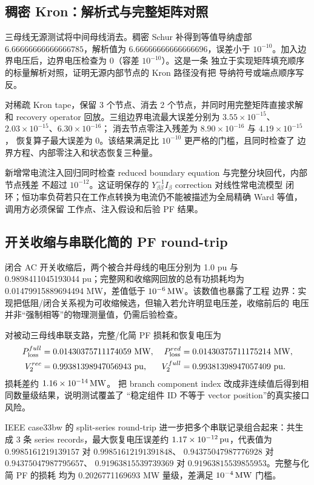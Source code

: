 \subsection{稠密 Kron：解析式与完整矩阵对照}

三母线无源测试将中间母线消去。稠密 Schur 补得到等值导纳虚部
\(6.66666666666666785\)，解析值为 \(6.66666666666666696\)，误差小于
\(10^{-10}\)。加入边界电压后，边界电压检查为 0（容差 \(10^{-10}\)）。这是一条
独立于实现矩阵填充顺序的标量解析对照，证明无源内部节点的 Kron 路径没有把
导纳符号或端点顺序写反。

对稀疏 Kron tape，保留 3 个节点、消去 2 个节点，并同时用完整矩阵直接求解和
recovery operator 回放。三组边界电流最大误差分别为
\(3.55\times10^{-15}\)、\(2.03\times10^{-15}\)、\(6.30\times10^{-16}\)；
消去节点零注入残差为 \(8.90\times10^{-16}\) 与 \(4.19\times10^{-15}\)，
恢复算子最大误差为 0。该结果满足比 \(10^{-10}\) 更严格的门槛，且同时检查了
边界方程、内部零注入和状态恢复三种量。

新增常电流注入回归同时检查 reduced boundary equation 与完整分块回代，内部节点残差
不超过 \(10^{-12}\)。这证明保存的 $Y_{\beta\beta}^{-1}I_\beta$ correction 对线性常电流模型
闭环；恒功率负荷若只在工作点转换为电流仍不能被描述为全局精确 Ward 等值，调用方必须保留
工作点、注入假设和后验 PF 结果。

\subsection{开关收缩与串联化简的 PF round-trip}

闭合 AC 开关收缩后，两个被合并母线的电压分别为 1.0 pu 与
0.9898411045193044 pu；完整网和收缩网回放的总有功损耗均为
0.01479915889694494 MW，差值低于 \(10^{-6}\,\rm MW\)。该数值也暴露了工程
边界：实现把低阻/闭合关系视为可收缩候选，但输入若允许明显电压差，收缩前后的
电压并非“强制相等”的物理测量值，仍需后验检查。

对被动三母线串联支路，完整/化简 PF 损耗和恢复电压为
\[
\begin{aligned}
P_{\rm loss}^{full}&=0.01430375711174059\ {\rm MW},&
P_{\rm loss}^{red}&=0.01430375711175214\ {\rm MW},\\
V_{2}^{rec}&=0.99381398947056943\ {\rm pu},&
V_{2}^{full}&=0.99381398947057409\ {\rm pu}.
\end{aligned}
\]
损耗差约 \(1.16\times10^{-14}\,\rm MW\)。
把 branch component index 改成非连续值后得到相同数量级结果，说明测试覆盖了
“稳定组件 ID 不等于 vector position”的真实接口风险。

IEEE case33bw 的 split-series round-trip 进一步把多个串联记录组合起来：共生成
3 条 series records，最大恢复电压误差约 \(1.17\times10^{-12}\,\rm pu\)，代表值为
\(0.9985161219139157\) 对 \(0.99851612191391848\)、
\(0.94375047987776928\) 对 \(0.94375047987795657\)、
\(0.91963815539739369\) 对 \(0.91963815539855953\)。完整与化简 PF 的损耗
均为 0.2026771169693 MW 量级，差满足 \(10^{-4}\,\rm MW\) 门槛。

